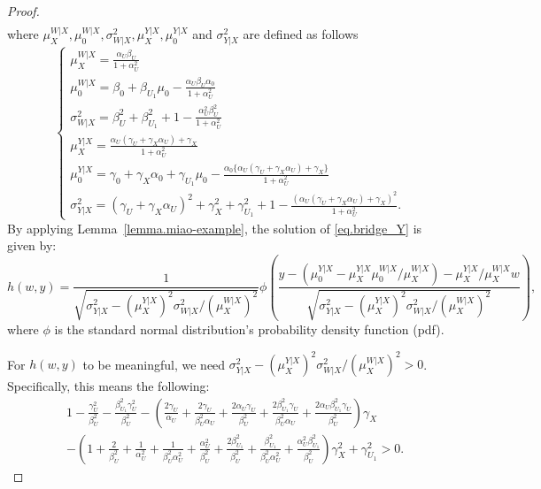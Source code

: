 \documentclass[
  12pt]{article}
\begin{document}
\begin{proof}
$$\begin{aligned}
\end{aligned}
$$
where $\mu_{X}^{W|X},\mu_{0}^{W|X},\sigma_{W|X}^{2}, \mu_{X}^{Y|X}, \mu_{0}^{Y|X}$ and $\sigma_{Y|X}^{2}$ are defined as follows
$$
\begin{cases}
	\mu_{X}^{W|X}=\frac{\alpha_U\beta_U}{1+\alpha_{U}^{2}}\\
	\mu_{0}^{W|X}=\beta_0+\beta_{U_1}\mu_0-\frac{\alpha_U\beta_U\alpha_0}{1+\alpha_{U}^{2}}\\
	\sigma_{W|X}^{2}=\beta_U^2+\beta_{U_1}^{2}+1-\frac{\alpha_{U}^{2}\beta_U^2}{1+\alpha_{U}^{2}}\\
	\mu_{X}^{Y|X}=\frac{\alpha_U\left( \gamma_U+\gamma_X\alpha_U \right) +\gamma_X}{1+\alpha_{U}^{2}}\\
	\mu_{0}^{Y|X}=\gamma_0+\gamma_X\alpha_0+\gamma_{U_1}\mu_0-\frac{\alpha_0\{\alpha_U\left( \gamma_U+\gamma_X\alpha_U \right) +\gamma_X\}}{1+\alpha_{U}^{2}}\\
	\sigma_{Y|X}^{2}=(\gamma_U+\gamma_X\alpha_U)^2+\gamma_{X}^{2}+\gamma_{U_1}^2+1-\frac{(\alpha_U\left( \gamma_U+\gamma_X\alpha_U \right) +\gamma_X)^2}{1+\alpha_{U}^{2}}.
\end{cases}
$$
By applying Lemma~\ref{lemma.miao-example}, the solution of \eqref{eq.bridge_Y} is given by:
$$
h(w,y)=\frac{1}{\sqrt{\sigma_{Y|X}^{2}-\left(\mu_{X}^{Y|X}\right)^2\sigma_{W|X}^{2}/\left(\mu_{X}^{W|X}\right)^2}}\phi \left( \frac{y-\left( \mu_{0}^{Y|X}-\mu_{X}^{Y|X}\mu_{0}^{W|X}/\mu_{X}^{W|X} \right) -\mu_{X}^{Y|X}/\mu_{X}^{W|X}w}{\sqrt{\sigma_{Y|X}^{2}-\left(\mu_{X}^{Y|X}\right)^2\sigma_{W|X}^{2}/\left(\mu_{X}^{W|X}\right)^2}} \right),
$$
where $\phi$ is the standard normal distribution's probability density function (pdf).

For $h(w, y)$ to be meaningful, we need $\sigma_{Y|X}^{2}-\left(\mu_{X}^{Y|X}\right)^2\sigma_{W|X}^{2}/\left(\mu_{X}^{W|X}\right)^2>0$. Specifically, this means the following: 
\begin{equation}\label{eq. solution_h_exist_bid}
\begin{aligned}
&1-\frac{\gamma_{U}^{2}}{\beta_U^2}-\frac{\beta_{U_1}^{2}\gamma_{U}^{2}}{\beta_U^2}-\left( \frac{2\gamma_U}{\alpha_U}+\frac{2\gamma_U}{\beta_U^2\alpha_U}+\frac{2\alpha_U\gamma_U}{\beta_U^2}+\frac{2\beta_{U_1}^{2}\gamma_U}{\beta_U^2\alpha_U}+\frac{2\alpha_U\beta_{U_1}^{2}\gamma_U}{\beta_U^2} \right) \gamma_X\\
	&-\left( 1+\frac{2}{\beta_U^2}+\frac{1}{\alpha_{U}^{2}}+\frac{1}{\beta_U^2\alpha_{U}^{2}}+\frac{\alpha_{U}^{2}}{\beta_U^2}+\frac{2\beta_{U_1}^{2}}{\beta_U^2}+\frac{\beta_{U_1}^{2}}{\beta_U^2\alpha_{U}^{2}}+\frac{\alpha_{U}^{2}\beta_{U_1}^{2}}{\beta_U^2} \right) \gamma_{X}^{2}+ \gamma_{U_1}^2>0.
\end{aligned}
\end{equation}


\end{proof}
\end{document}
